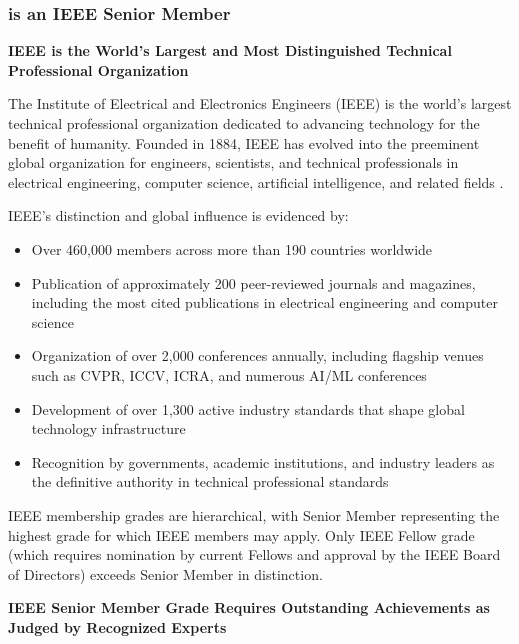 

\subsubsection{\dr is an IEEE Senior Member}
\label{member:ieee}

\textbf{IEEE is the World's Largest and Most Distinguished Technical Professional Organization}

The Institute of Electrical and Electronics Engineers (IEEE) is the world's largest technical professional organization dedicated to advancing technology for the benefit of humanity. Founded in 1884, IEEE has evolved into the preeminent global organization for engineers, scientists, and technical professionals in electrical engineering, computer science, artificial intelligence, and related fields \cite{ieeehistory}.

IEEE's distinction and global influence is evidenced by:
\begin{itemize}
    \item Over 460,000 members across more than 190 countries worldwide
    \item Publication of approximately 200 peer-reviewed journals and magazines, including the most cited publications in electrical engineering and computer science
    \item Organization of over 2,000 conferences annually, including flagship venues such as CVPR, ICCV, ICRA, and numerous AI/ML conferences
    \item Development of over 1,300 active industry standards that shape global technology infrastructure
    \item Recognition by governments, academic institutions, and industry leaders as the definitive authority in technical professional standards
\end{itemize}

IEEE membership grades are hierarchical, with Senior Member representing the highest grade for which IEEE members may apply. Only IEEE Fellow grade (which requires nomination by current Fellows and approval by the IEEE Board of Directors) exceeds Senior Member in distinction.

\textbf{IEEE Senior Member Grade Requires Outstanding Achievements as Judged by Recognized Experts}

